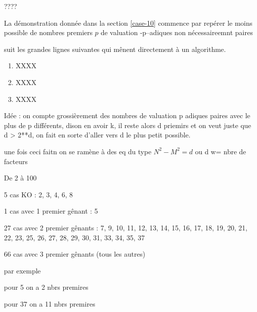 \leavevmode
\smallskip

????


La démonstration donnée dans la section \ref{case-10} commence par repérer le moins possible de nombres premiers $p$ de valuation -p--adiques non nécessaireemnt paires 



suit les grandes lignes suivantes qui mênent directement à un algorithme.
%
\begin{enumerate}
	\item XXXX

	\item XXXX

	\item XXXX
\end{enumerate}





\newpage
Idée : on compte grossièrement des nombres de valuation p adiques paires avec le plus de p différents, dison en avoir k, il reste alors d priemirs et on veut juste que d > 2**d, on fait en sorte d'aller vers d le plus petit possible.

une fois ceci faitn on se ramène à des eq du type $N^2 - M^2 = d$ ou d w= nbre de facteurs


De 2 à 100


5 cas KO : 
2, 3, 4, 6, 8


1 cas avec 1 premier gênant :
5


27 cas avec 2 premier gênants :
7, 9, 10, 11, 12, 13, 14, 15, 16, 17, 18, 19, 20, 21, 22, 23, 25, 26, 27, 28, 29, 30, 31, 33, 34, 35, 37


66 cas avec 3 premier gênants (tous les autres)


par exemple


pour 5 on a 2 nbrs premires
	 

pour 37 on a 11 nbrs premires
	 
\vspace{-1ex}
\begin{center}
\end{center}




